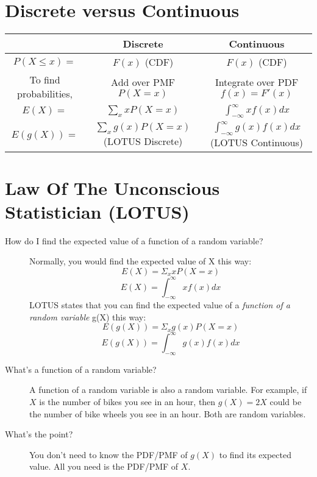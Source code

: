\documentclass[11pt]{article}
\theoremstyle{definition}
\theoremstyle{remark}
\renewcommand{\var}[1]{\textnormal{Var}\left[ #1 \right]}
\begin{document}
\section{Discrete versus Continuous}
\begin{table}[H] \begin{center}
	\begin{tabular}{ccc}
	\hline
		~ & \textbf{Discrete} & \textbf{Continuous} \\ \hline
		$P(X \leq x) = $  & $F(x)$ (CDF) & $F(x)$ (CDF) \\ 
		To find probabilities, & Add over PMF $P(X = x)$ & Integrate over PDF $f(x) = F'(x)$ \\ 
		$E(X) =$ & $\sum_x xP(X=x)$ & $\int_{-\infty}^{\infty}xf(x)dx$ \\ 
		$E(g(X)) =$ & $\sum_x g(x)P(X=x)$ (LOTUS Discrete) & $\int_{-\infty}^{\infty} g(x)f(x)dx$ (LOTUS Continuous)
	\end{tabular}\end{center}
\end{table}

\section{Law Of The Unconscious Statistician (LOTUS)}
\begin{description}
\item[How do I find the expected value of a function of a random variable?]
Normally, you would find the expected value of X this way:
\[E(X) = \Sigma_x xP(X=x) \]
\[E(X) = \int^\infty_{-\infty}xf(x)dx \]
LOTUS states that you can find the expected value of a \emph{function of a random variable} g(X) this way:
\[E(g(X)) = \Sigma_x g(x)P(X=x) \]
\[E(g(X)) = \int^\infty_{-\infty}g(x)f(x)dx \]
\item[What's a function of a random variable?] A function of a random variable is also a random variable. For example, if $X$ is the number of bikes you see in an hour, then $g(X) =  2X$ could be the number of bike wheels you see in an hour. Both are random variables.
\item[What's the point?] You don't need to know the PDF/PMF of $g(X)$ to find its expected value. All you need is the PDF/PMF of $X$. 
\end{description}


\end{document}
